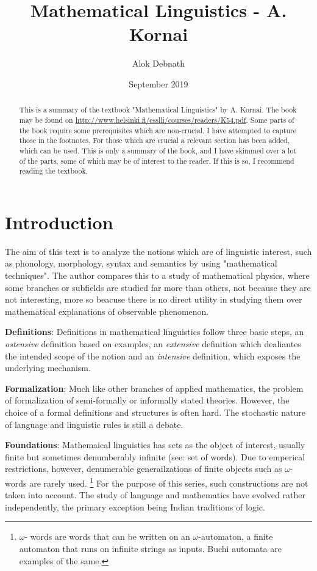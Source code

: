 \documentclass{report}
\title{Mathematical Linguistics - A. Kornai}
\author{Alok Debnath}
\date{September 2019}
\begin{document}
\maketitle
\begin{abstract}
  This is a summary of the textbook "Mathematical Linguistics" by A. Kornai.
  The book may be found on
  \url{http://www.helsinki.fi/esslli/courses/readers/K54.pdf}.
  Some parts of the book require some prerequisites which are non-crucial. I
  have attempted to capture those in the footnotes. For those which are crucial
  a relevant section has been added, which can be used. This is only a summary
  of the book, and I have skimmed over a lot of the parts, some of which may
  be of interest to the reader. If this is so, I recommend reading the 
  textbook.
\end{abstract}

\chapter{Introduction}

The aim of this text is to analyze the notions which are of linguistic
interest, such as phonology, morphology, syntax and semantics by using
"mathematical techniques". The author compares this to a study of mathematical
physics, where some branches or subfields are studied far more than others, not
because they are not interesting, more so beacuse there is no direct utility in
studying them over mathematical explanations of observable phenomenon.

\textbf{Definitions}: Definitions in mathematical linguistics follow three
basic steps, an \textit{ostensive} definition based on examples, an
\textit{extensive} definition which dealiantes the intended scope of the notion
and an \textit{intensive} definition, which exposes the underlying mechanism.

\textbf{Formalization}: Much like other branches of applied mathematics, the
problem of formalization of semi-formally or informally stated theories.
However, the choice of a formal definitions and structures is often hard. The
stochastic nature of language and linguistic rules is still a debate.

\textbf{Foundations}: Mathemaical linguistics has sets as the object of
interest, usually finite but sometimes denumberably infinite (see: set of
words). Due to emperical restrictions, however, denumerable generailzations
of finite objects such as $\omega$-words are rarely used. \footnote{$\omega$-
  words are words that can be written on an $\omega$-automaton, a finite 
automaton that runs on infinite strings as inputs. Buchi automata are examples
of the same.} For the purpose of this series, such constructions are not taken
into account. The study of language and mathematics have evolved rather
independently, the primary exception being Indian traditions of logic.
\end{document}
